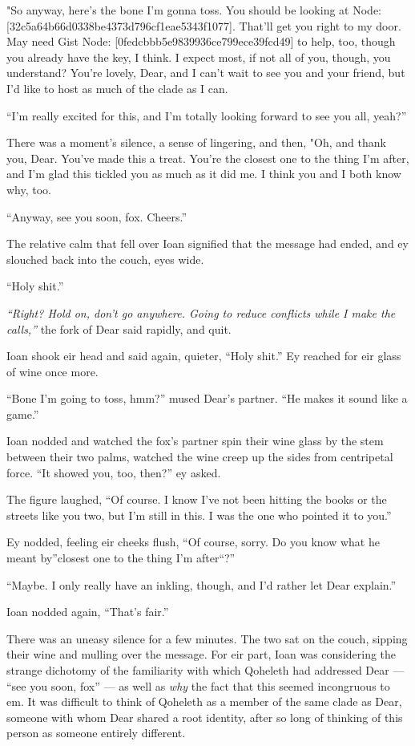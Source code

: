 "So anyway, here's the bone I'm gonna toss. You should be looking at Node: {[}32c5a64b66d0338be4373d796cf1eae5343f1077{]}. That'll get you right to my door. May need Gist Node: {[}0fedcbbb5e9839936ce799ece39fcd49{]} to help, too, though you already have the key, I think. I expect most, if not all of you, though, you understand? You're lovely, Dear, and I can't wait to see you and your friend, but I'd like to host as much of the clade as I can.

``I'm really excited for this, and I'm totally looking forward to see you all, yeah?''

There was a moment's silence, a sense of lingering, and then, "Oh, and thank you, Dear. You've made this a treat. You're the closest one to the thing I'm after, and I'm glad this tickled you as much as it did me. I think you and I both know why, too.

``Anyway, see you soon, fox. Cheers.''

The relative calm that fell over Ioan signified that the message had ended, and ey slouched back into the couch, eyes wide.

``Holy shit.''

\emph{``Right? Hold on, don't go anywhere. Going to reduce conflicts while I make the calls,''} the fork of Dear said rapidly, and quit.

Ioan shook eir head and said again, quieter, ``Holy shit.'' Ey reached for eir glass of wine once more.

``Bone I'm going to toss, hmm?'' mused Dear's partner. ``He makes it sound like a game.''

Ioan nodded and watched the fox's partner spin their wine glass by the stem between their two palms, watched the wine creep up the sides from centripetal force. ``It showed you, too, then?'' ey asked.

The figure laughed, ``Of course. I know I've not been hitting the books or the streets like you two, but I'm still in this. I was the one who pointed it to you.''

Ey nodded, feeling eir cheeks flush, ``Of course, sorry. Do you know what he meant by''closest one to the thing I'm after``?''

``Maybe. I only really have an inkling, though, and I'd rather let Dear explain.''

Ioan nodded again, ``That's fair.''

There was an uneasy silence for a few minutes. The two sat on the couch, sipping their wine and mulling over the message. For eir part, Ioan was considering the strange dichotomy of the familiarity with which Qoheleth had addressed Dear — ``see you soon, fox'' — as well as \emph{why} the fact that this seemed incongruous to em. It was difficult to think of Qoheleth as a member of the same clade as Dear, someone with whom Dear shared a root identity, after so long of thinking of this person as someone entirely different.

